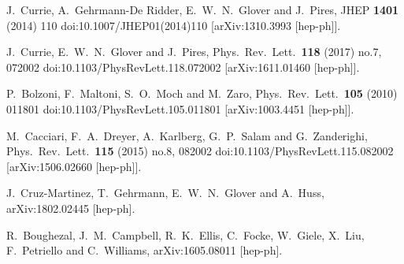 
  J.~Currie, A.~Gehrmann-De Ridder, E.~W.~N.~Glover and J.~Pires,
  JHEP {\bf 1401} (2014) 110
  doi:10.1007/JHEP01(2014)110
  [arXiv:1310.3993 [hep-ph]].


  J.~Currie, E.~W.~N.~Glover and J.~Pires,
  Phys.\ Rev.\ Lett.\  {\bf 118} (2017) no.7,  072002
  doi:10.1103/PhysRevLett.118.072002
  [arXiv:1611.01460 [hep-ph]].


  P.~Bolzoni, F.~Maltoni, S.~O.~Moch and M.~Zaro,
  Phys.\ Rev.\ Lett.\  {\bf 105} (2010) 011801
  doi:10.1103/PhysRevLett.105.011801
  [arXiv:1003.4451 [hep-ph]].

  M.~Cacciari, F.~A.~Dreyer, A.~Karlberg, G.~P.~Salam and G.~Zanderighi,
  Phys.\ Rev.\ Lett.\  {\bf 115} (2015) no.8,  082002
  doi:10.1103/PhysRevLett.115.082002
  [arXiv:1506.02660 [hep-ph]].

  J.~Cruz-Martinez, T.~Gehrmann, E.~W.~N.~Glover and A.~Huss,
  arXiv:1802.02445 [hep-ph].



  R.~Boughezal, J.~M.~Campbell, R.~K.~Ellis, C.~Focke, W.~Giele, X.~Liu, F.~Petriello and C.~Williams,
  arXiv:1605.08011 [hep-ph].



